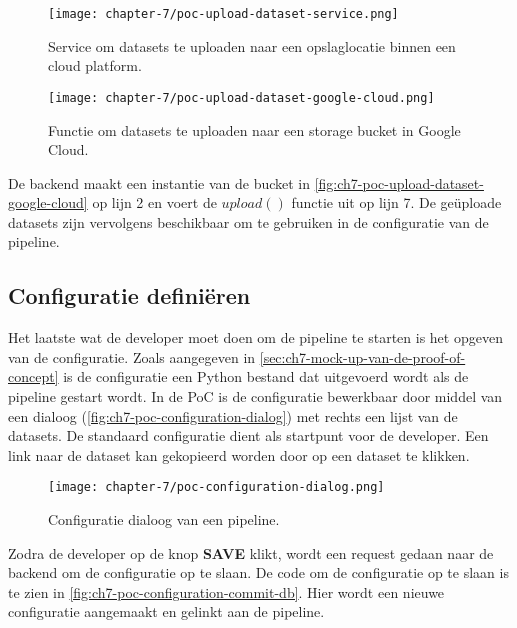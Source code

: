 \begin{figure}[hbt!]
  \centering
  \texttt{[image: chapter-7/poc-upload-dataset-service.png]}
  \caption{Service om datasets te uploaden naar een opslaglocatie binnen een cloud platform.}
  \label{fig:ch7-poc-upload-dataset-service}
\end{figure}

\newpage

\begin{figure}[hbt!]
  \centering
  \texttt{[image: chapter-7/poc-upload-dataset-google-cloud.png]}
  \caption{Functie om datasets te uploaden naar een storage bucket in Google Cloud.}
  \label{fig:ch7-poc-upload-dataset-google-cloud}
\end{figure}

De backend maakt een instantie van de bucket in \autoref{fig:ch7-poc-upload-dataset-google-cloud} op lijn 2 en voert de \(upload()\) functie uit op lijn 7. De geüploade datasets zijn vervolgens beschikbaar om te gebruiken in de configuratie van de pipeline.

\subsection{Configuratie definiëren}\label{subsec:ch7-configuratie-definieren}
Het laatste wat de developer moet doen om de pipeline te starten is het opgeven van de configuratie. Zoals aangegeven in \autoref{sec:ch7-mock-up-van-de-proof-of-concept} is de configuratie een Python bestand dat uitgevoerd wordt als de pipeline gestart wordt. In de PoC is de configuratie bewerkbaar door middel van een dialoog (\autoref{fig:ch7-poc-configuration-dialog}) met rechts een lijst van de datasets. De standaard configuratie dient als startpunt voor de developer. Een link naar de dataset kan gekopieerd worden door op een dataset te klikken.

\begin{figure}[hbt!]
  \centering
  \texttt{[image: chapter-7/poc-configuration-dialog.png]}
  \caption{Configuratie dialoog van een pipeline.}
  \label{fig:ch7-poc-configuration-dialog}
\end{figure}

Zodra de developer op de knop \textbf{SAVE} klikt, wordt een request gedaan naar de backend om de configuratie op te slaan. De code om de configuratie op te slaan is te zien in \autoref{fig:ch7-poc-configuration-commit-db}. Hier wordt een nieuwe configuratie aangemaakt en gelinkt aan de pipeline.

